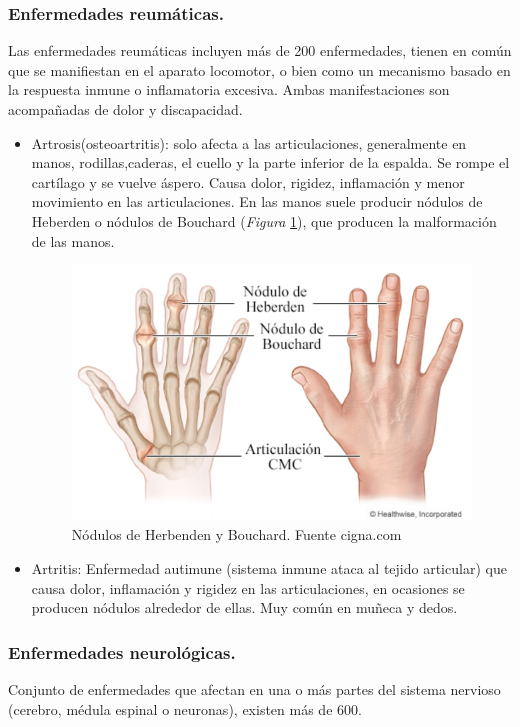 \subsubsection{Enfermedades reumáticas.}
Las enfermedades reumáticas incluyen más de 200 enfermedades, tienen en común que se manifiestan en el aparato locomotor, o bien como un mecanismo basado en la respuesta inmune o inflamatoria excesiva. Ambas manifestaciones son acompañadas de dolor y discapacidad. 
\cite{enfermedades_Reumáticas}
\begin{itemize}
    \item Artrosis(osteoartritis): solo afecta a las articulaciones, generalmente en manos, rodillas,caderas, el cuello y la parte inferior de la espalda. Se rompe el cartílago y se vuelve áspero. Causa dolor, rigidez, inflamación y menor movimiento en las articulaciones. En las manos suele producir nódulos de Heberden o nódulos de Bouchard (\textit{Figura} \ref{fig:Nódulos}), que producen la malformación de las manos. \cite{osteoartritis}
\cite{nodulos}
    \begin{figure}
        \centering
        \includegraphics[width=0.75\linewidth]{img/Nodulos.png}
        \caption{Nódulos de Herbenden y Bouchard. Fuente cigna.com}
        \label{fig:Nódulos}
    \end{figure}
    \item Artritis: Enfermedad autimune (sistema inmune ataca al tejido articular) que causa dolor, inflamación y rigidez en las articulaciones, en ocasiones se producen nódulos alrededor de ellas. 
    Muy común en muñeca y dedos. \cite{artritis}
\end{itemize}

\subsubsection{Enfermedades neurológicas.}
Conjunto de enfermedades que afectan en una o más partes del sistema nervioso (cerebro, médula espinal o neuronas), existen más de 600. 

